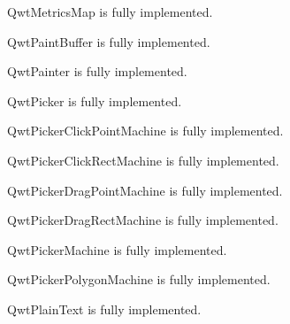 \documentclass{manual}
\begin{document}
\begin{classdesc*}{QwtMetricsMap}
  is fully implemented.
\end{classdesc*}

\begin{classdesc*}{QwtPaintBuffer}
  is fully implemented.
\end{classdesc*}

\begin{classdesc*}{QwtPainter}
  is fully implemented.
\end{classdesc*}

\begin{classdesc*}{QwtPicker}
  is fully implemented.
\end{classdesc*}

\begin{classdesc*}{QwtPickerClickPointMachine}
  is fully implemented.
\end{classdesc*}

\begin{classdesc*}{QwtPickerClickRectMachine}
  is fully implemented.
\end{classdesc*}

\begin{classdesc*}{QwtPickerDragPointMachine}
  is fully implemented.
\end{classdesc*}

\begin{classdesc*}{QwtPickerDragRectMachine}
  is fully implemented.
\end{classdesc*}

\begin{classdesc*}{QwtPickerMachine}
  is fully implemented.
\end{classdesc*}

\begin{classdesc*}{QwtPickerPolygonMachine}
  is fully implemented.
\end{classdesc*}

\begin{classdesc*}{QwtPlainText}
  is fully implemented.
\end{classdesc*}
\end{document}
